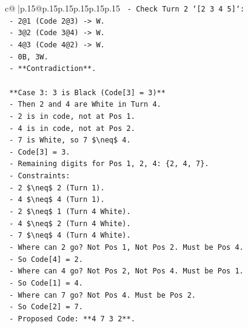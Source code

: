 \documentclass{article}
\begin{document}
{\begin{supertabular}{c@{$\;$}|p{.15\linewidth}@{}p{.15\linewidth}p{.15\linewidth}p{.15\linewidth}p{.15\linewidth}p{.15\linewidth}}
{{{\texttt{          {-} Check Turn 2 `{[}2 3 4 5{]}`:} \\
\texttt{            {-} 2@1 (Code 2@3) {-}> W.} \\
\texttt{            {-} 3@2 (Code 3@4) {-}> W.} \\
\texttt{            {-} 4@3 (Code 4@2) {-}> W.} \\
\texttt{            {-} 0B, 3W.} \\
\texttt{            {-} **Contradiction**.} \\
\\ 
\texttt{        **Case 3: 3 is Black (Code{[}3{]} = 3)**} \\
\texttt{        {-} Then 2 and 4 are White in Turn 4.} \\
\texttt{          {-} 2 is in code, not at Pos 1.} \\
\texttt{          {-} 4 is in code, not at Pos 2.} \\
\texttt{        {-} 7 is White, so 7 \$\textbackslash{}neq\$ 4.} \\
\texttt{        {-} Code{[}3{]} = 3.} \\
\texttt{        {-} Remaining digits for Pos 1, 2, 4: \{2, 4, 7\}.} \\
\texttt{        {-} Constraints:} \\
\texttt{          {-} 2 \$\textbackslash{}neq\$ 2 (Turn 1).} \\
\texttt{          {-} 4 \$\textbackslash{}neq\$ 4 (Turn 1).} \\
\texttt{          {-} 2 \$\textbackslash{}neq\$ 1 (Turn 4 White).} \\
\texttt{          {-} 4 \$\textbackslash{}neq\$ 2 (Turn 4 White).} \\
\texttt{          {-} 7 \$\textbackslash{}neq\$ 4 (Turn 4 White).} \\
\texttt{        {-} Where can 2 go? Not Pos 1, Not Pos 2. Must be Pos 4.} \\
\texttt{          {-} So Code{[}4{]} = 2.} \\
\texttt{        {-} Where can 4 go? Not Pos 2, Not Pos 4. Must be Pos 1.} \\
\texttt{          {-} So Code{[}1{]} = 4.} \\
\texttt{        {-} Where can 7 go? Not Pos 4. Must be Pos 2.} \\
\texttt{          {-} So Code{[}2{]} = 7.} \\
\texttt{        {-} Proposed Code: **4 7 3 2**.} \\
\\ 
}}}
\end{supertabular}}
\end{document}
